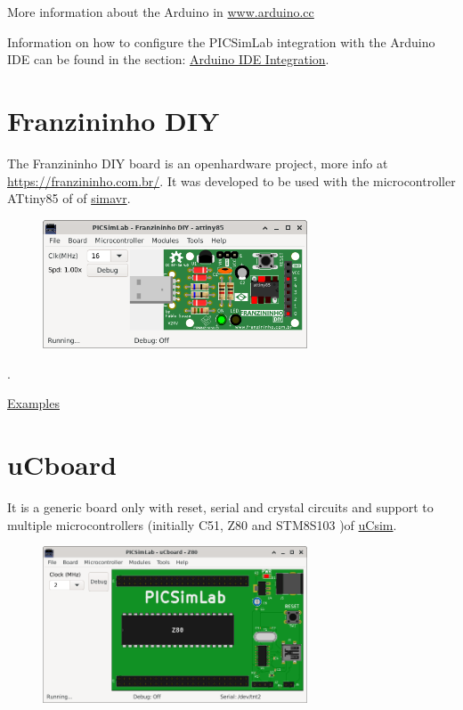 More information about the Arduino in \href{https://www.arduino.cc/}{www.arduino.cc}

Information on how to configure the PICSimLab integration with the Arduino IDE can be found in the 
section: \hyperlink{def:arduinoide}{Arduino IDE Integration}.

\section{Franzininho DIY}

The Franzininho DIY board is an openhardware project, more info at \href{https://franzininho.com.br/}{https://franzininho.com.br/}.
It was developed to be used with the microcontroller ATtiny85 of 
of \href{https://github.com/buserror/simavr}{simavr}.

\begin{figure}[H]
\center
\includegraphics[width=0.7\textwidth]{img/board_Franzininho_DIY.png} 
\end{figure} 

.\vspace{0.5cm}

\href{https://lcgamboa.github.io/picsimlab_examples/board_Franzininho_DIY.html}{Examples}


\section{uCboard}

It is a generic board only with reset, serial and crystal circuits and support to multiple microcontrollers 
(initially C51, Z80 and STM8S103 )of \href{http://mazsola.iit.uni-miskolc.hu/\%7edrdani/embedded/ucsim/}{uCsim}.

\begin{figure}[H]
\center
\includegraphics[width=0.7\textwidth]{img/uCboard.png} 
\end{figure} 

